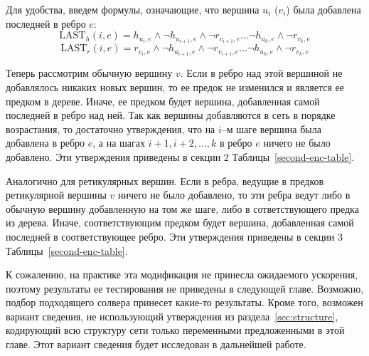Для удобства, введем формулы, означающие, что вершина $u_i$ ($v_i$) была добавлена последней в ребро $e$:
$$\mathrm{LAST}_h(i, e) = h_{u_i, e} \wedge \neg h_{u_{i+1}, e} \wedge \neg r_{v_{i+1}, e} \dots \neg h_{u_k, e} \wedge \neg r_{v_k, e}$$
$$\mathrm{LAST}_r(i, e) = r_{v_i, e} \wedge \neg h_{u_{i+1}, e} \wedge \neg r_{v_{i+1}, e} \dots \neg h_{u_k, e} \wedge \neg r_{v_k, e}$$

Теперь рассмотрим обычную вершину $v$.
Если в ребро над этой вершиной не добавлялось никаких новых вершин, то ее предок не изменился и является ее предком в дереве.
Иначе, ее предком будет вершина, добавленная самой последней в ребро над ней.
Так как вершины добавляются в сеть в порядке возрастания, то достаточно утверждения, что на $i$--м шаге вершина была добавлена в ребро $e$, а на шагах $i+1, i+2, \dots , k$ в ребро $e$ ничего не было добавлено.
Эти утверждения приведены в секции 2 Таблицы~\ref{second-enc-table}.

Аналогично для ретикулярных вершин.
Если в ребра, ведущие в предков ретикулярной вершины $v$ ничего не было добавлено, то эти ребра ведут либо в обычную вершину добавленную на том же шаге, либо в сответствующего предка из дерева.
Иначе, соответствующим предком будет вершина, добавленная самой последней в соответствующее ребро.
Эти утверждения приведены в секции 3 Таблицы~\ref{second-enc-table}.

К сожалению, на практике эта модификация не принесла ожидаемого ускорения, поэтому результаты ее тестирования не приведены в следующей главе.
Возможно, подбор подходящего солвера принесет какие-то результаты.
Кроме того, возможен вариант сведения, не использующий утверждения из раздела~\ref{sec:structure}, кодирующий всю структуру сети только переменными предложенными в этой главе.
Этот вариант сведения будет исследован в дальнейшей работе.
